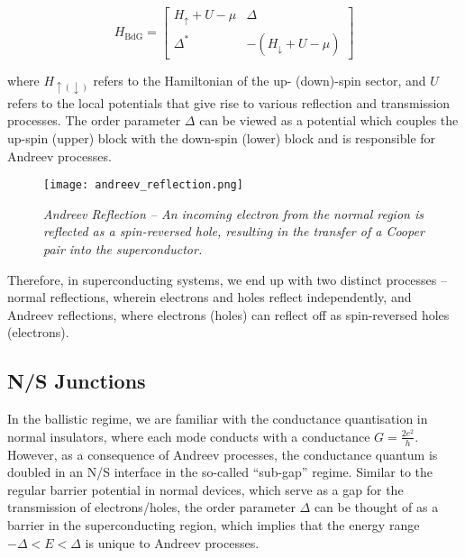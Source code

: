 \begin{equation} \label{eq:BdG}
    H_{\text{BdG}} = \begin{bmatrix}
            H_{\uparrow}+U-\mu & \Delta \\
            \Delta^{*} & -(H_{\downarrow}+U-\mu)
    \end{bmatrix}    
\end{equation}

where $H_{\uparrow(\downarrow)}$ refers to the Hamiltonian of the up- (down)-spin sector, and $U$ refers to the local potentials that give rise to various reflection and transmission processes. The order parameter $\Delta$ can be viewed as a potential which couples the up-spin (upper) block with the down-spin (lower) block and is responsible for Andreev processes. 

\vspace{1cm}

\begin{figure}[h]
\centering
\texttt{[image: andreev\_reflection.png]}
\caption{\textit{Andreev Reflection -- An incoming electron from the normal region is reflected as a spin-reversed hole, resulting in the transfer of a Cooper pair into the superconductor.}}
\end{figure}

\vspace{1cm}

Therefore, in superconducting systems, we end up with two distinct processes -- normal reflections, wherein electrons and holes reflect independently, and Andreev reflections, where electrons (holes) can reflect off as spin-reversed holes (electrons). 

\clearpage 

\subsection{N/S Junctions} \label{subsec:NS}

In the ballistic regime, we are familiar with the conductance quantisation in normal insulators, where each mode conducts with a conductance $G = \frac{2e^{2}}{h}$. However, as a consequence of Andreev processes, the conductance quantum is doubled in an N/S interface in the so-called ``sub-gap'' regime. Similar to the regular barrier potential in normal devices, which serve as a gap for the transmission of electrons/holes, the order parameter $\Delta$ can be thought of as a barrier in the superconducting region, which implies that the energy range $-\Delta < E < \Delta$ is unique to Andreev processes. \par 

